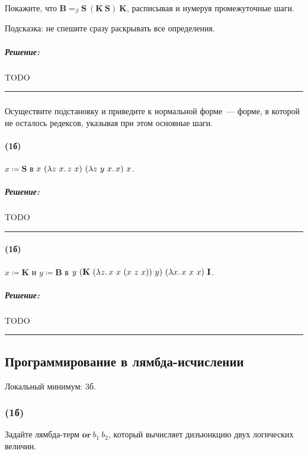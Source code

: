 \documentclass{article}
\newenvironment{proof}{\subparagraph{\hspace{-1em}Решение:\newline}}{\par\noindent\rule{\textwidth}{0.4pt}}
\newcommand{\comb}[1]{\mathbf{#1}}
\newcommand{\termdef}{\coloneqq}
\newcommand{\eqbeta}{=_\beta}
\begin{document}
    Покажите, что $\comb{B} \eqbeta \comb{S}~(\comb{K}~\comb{S})~\comb{K}$, расписывая и нумеруя промежуточные шаги.

    Подсказка: не спешите сразу раскрывать все определения.

    \begin{proof}
        TODO %
    \end{proof}

    \subsubsection{}

    Осуществите подстановку и приведите к нормальной форме~--- форме, в которой не осталось редексов, указывая при этом основные шаги.

    \paragraph{(1б)}

    $x \termdef \comb{S}$ в $x~(\lambda z~x\ldotp z~x)~(\lambda z~y~x\ldotp x)~x$.

    \begin{proof}
        TODO %
    \end{proof}

    \paragraph{(1б)}

    $x \termdef \comb{K}$ и $y \termdef \comb{B}$ в $y~(\comb{K}~(\lambda z\ldotp x~x~(x~z~x))~y)~(\lambda x\ldotp x~x~x)~\comb{I}$.

    \begin{proof}
        TODO %
    \end{proof}

    \subsection{Программирование в лямбда-исчислении}

    Локальный минимум: 3б.

    \subsubsection{(1б)}

    Задайте лямбда-терм $\textbf{or}~b_1~b_2$, который вычисляет дизъюнкцию двух логических величин.
\end{document}
